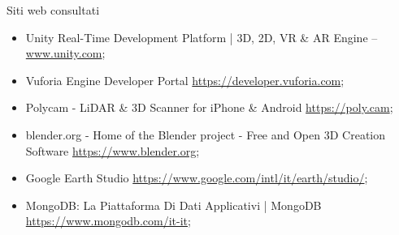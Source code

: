 \cleardoublepage
{}
{}
\nocite{*}


%

\vspace{2.5cm}
\begin{Large}Siti web consultati\end{Large}
\begin{itemize}
    \item Unity Real-Time Development Platform | 3D, 2D, VR \& AR Engine -- \url{www.unity.com};
    \item Vuforia Engine Developer Portal \url{https://developer.vuforia.com};
    \item Polycam - LiDAR \& 3D Scanner for iPhone \& Android \url{https://poly.cam};
    \item blender.org - Home of the Blender project - Free and Open 3D Creation Software \url{https://www.blender.org};
    \item Google Earth Studio \url{https://www.google.com/intl/it/earth/studio/};
    \item MongoDB: La Piattaforma Di Dati Applicativi | MongoDB \url{https://www.mongodb.com/it-it};
\end{itemize}

